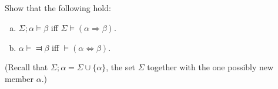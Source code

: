 \documentclass{report}
\begin{document}
\subsection{}%

  Show that the following hold:
    \begin{enumerate}[(a)]
      \item $\Sigma; \alpha \vDash \beta$ iff
        $\Sigma \vDash (\alpha \Rightarrow \beta)$.
      \item $\alpha \vDash \Dashv \beta$ iff
        $\vDash (\alpha \Leftrightarrow \beta)$.
    \end{enumerate}
  (Recall that $\Sigma; \alpha = \Sigma \cup \{\alpha\}$, the set $\Sigma$
    together with the one possibly new member $\alpha$.)
\end{document}
